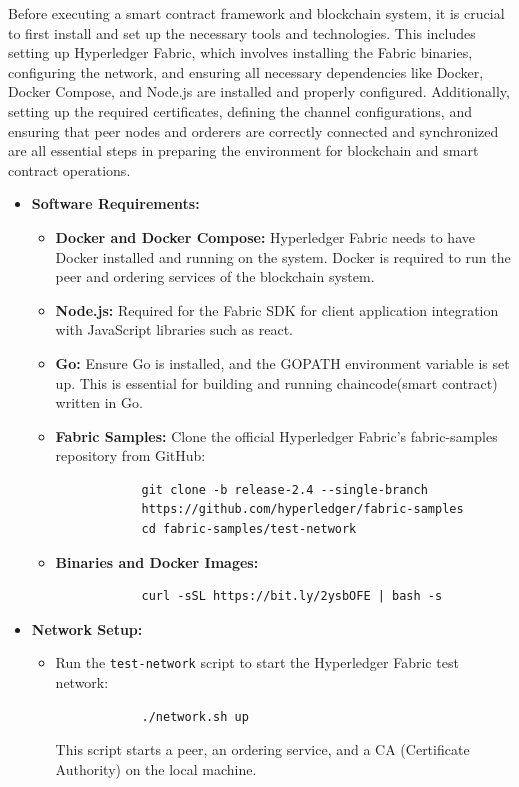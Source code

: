 Before executing a smart contract framework and blockchain system, it is crucial to first install and set up the necessary tools and technologies. This includes setting up Hyperledger Fabric, which involves installing the Fabric binaries, configuring the network, and ensuring all necessary dependencies like Docker, Docker Compose, and Node.js are installed and properly configured. Additionally, setting up the required certificates, defining the channel configurations, and ensuring that peer nodes and orderers are correctly connected and synchronized are all essential steps in preparing the environment for blockchain and smart contract operations.
\begin{itemize}
	\item \textbf{Software Requirements:}
	\begin{itemize}
		\item \textbf{Docker and Docker Compose:} Hyperledger Fabric needs to have Docker installed and running on the system. Docker is required to run the peer and ordering services of the blockchain system.
		\item \textbf{Node.js:} Required for the Fabric SDK for client application integration with JavaScript libraries such as react.
		\item \textbf{Go:} Ensure Go is installed, and the GOPATH environment variable is set up. This is essential for building and running chaincode(smart contract) written in Go.
		\item \textbf{Fabric Samples:} Clone the official Hyperledger Fabric's fabric-samples repository from GitHub:
		\begin{verbatim}
			git clone -b release-2.4 --single-branch 
			https://github.com/hyperledger/fabric-samples
			cd fabric-samples/test-network
		\end{verbatim}
		\item \textbf{Binaries and Docker Images:}
		\begin{verbatim}
			curl -sSL https://bit.ly/2ysbOFE | bash -s
		\end{verbatim}
	\end{itemize}
	\item \textbf{Network Setup:}
	\begin{itemize}
		\item Run the \texttt{test-network} script to start the Hyperledger Fabric test network:
		\begin{verbatim}
			./network.sh up
		\end{verbatim}
		This script starts a peer, an ordering service, and a CA (Certificate Authority) on the local machine.

\end{itemize}
\end{itemize}
